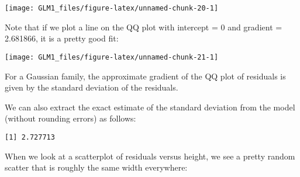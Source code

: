 \documentclass[
]{article}
\newenvironment{Shaded}{\begin{snugshade}}{\end{snugshade}}
\newcommand{\AttributeTok}[1]{\textcolor[rgb]{0.77,0.63,0.00}{#1}}
\newcommand{\DecValTok}[1]{\textcolor[rgb]{0.00,0.00,0.81}{#1}}
\newcommand{\FloatTok}[1]{\textcolor[rgb]{0.00,0.00,0.81}{#1}}
\newcommand{\FunctionTok}[1]{\textcolor[rgb]{0.00,0.00,0.00}{#1}}
\newcommand{\NormalTok}[1]{#1}
\newcommand{\SpecialCharTok}[1]{\textcolor[rgb]{0.00,0.00,0.00}{#1}}
\newcommand{\StringTok}[1]{\textcolor[rgb]{0.31,0.60,0.02}{#1}}
\begin{document}
\begin{center}\texttt{[image: GLM1\_files/figure-latex/unnamed-chunk-20-1]} \end{center}

Note that if we plot a line on the QQ plot with intercept = 0 and
gradient = 2.681866, it is a pretty good fit:

\begin{Shaded}
\end{Shaded}

\begin{center}\texttt{[image: GLM1\_files/figure-latex/unnamed-chunk-21-1]} \end{center}

For a Gaussian family, the approximate gradient of the QQ plot of
residuals is given by the standard deviation of the residuals.

We can also extract the exact estimate of the standard deviation from
the model (without rounding errors) as follows:

\begin{Shaded}
\end{Shaded}

\begin{verbatim}
[1] 2.727713
\end{verbatim}

When we look at a scatterplot of residuals versus height, we see a
pretty random scatter that is roughly the same width everywhere:

\begin{Shaded}
\end{Shaded}
\end{document}
